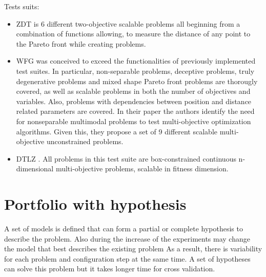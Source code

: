         Tests suits:
        \begin{itemize}
            \item ZDT \cite{ZitzlerDT00} is 6 different two-objective scalable problems all beginning from a combination of functions allowing, to measure the distance of any point to the Pareto front while creating problems.
            \item WFG \cite{WFGref} was conceived to exceed the functionalities of previously implemented test suites. In particular, non-separable problems, deceptive problems, truly degenerative problems and mixed shape Pareto front problems are thorougly covered, as well as scalable problems in both the number of objectives and variables. Also, problems with dependencies between position and distance related parameters are covered. In their paper the authors identify the need for nonseparable multimodal problems to test multi-objective optimization algorithms. Given this, they propose a set of 9 different scalable multi-objective unconstrained problems.
            \item DTLZ \cite{DebTLZ05}. All problems in this test suite are box-constrained continuous n-dimensional multi-objective problems, scalable in fitness dimension.
        \end{itemize}



\section{Portfolio with hypothesis}
A set of models is defined that can form a partial or complete hypothesis to describe the problem.
Also during the increase of the experiments may change the model that best describes the existing problem
As a result, there is variability for each problem and configuration step at the same time. 
A set of hypotheses can solve this problem but it takes longer time for cross validation.


